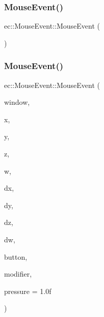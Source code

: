 \subsubsection{\texorpdfstring{Mouse\+Event()}{MouseEvent()}\hspace{0.1cm}{\footnotesize\ttfamily [1/2]}}
{\footnotesize\ttfamily ec\+::\+Mouse\+Event\+::\+Mouse\+Event (\begin{DoxyParamCaption}{ }\end{DoxyParamCaption})\hspace{0.3cm}{\ttfamily [explicit]}}

\mbox{\label{structec_1_1_mouse_event_af9aa266623dd0b951176a97969ab11f7}} 
\subsubsection{\texorpdfstring{Mouse\+Event()}{MouseEvent()}\hspace{0.1cm}{\footnotesize\ttfamily [2/2]}}
{\footnotesize\ttfamily ec\+::\+Mouse\+Event\+::\+Mouse\+Event (\begin{DoxyParamCaption}\item[{G\+L\+F\+Wwindow $\ast$}]{window,  }\item[{int}]{x,  }\item[{int}]{y,  }\item[{int}]{z,  }\item[{int}]{w,  }\item[{int}]{dx,  }\item[{int}]{dy,  }\item[{int}]{dz,  }\item[{int}]{dw,  }\item[{unsigned int}]{button,  }\item[{int}]{modifier,  }\item[{float}]{pressure = {\ttfamily 1.0f} }\end{DoxyParamCaption})\hspace{0.3cm}{\ttfamily [explicit]}}

\mbox{\label{structec_1_1_mouse_event_a1284b01bc0cbece09efe65d2469b7f26}} 
